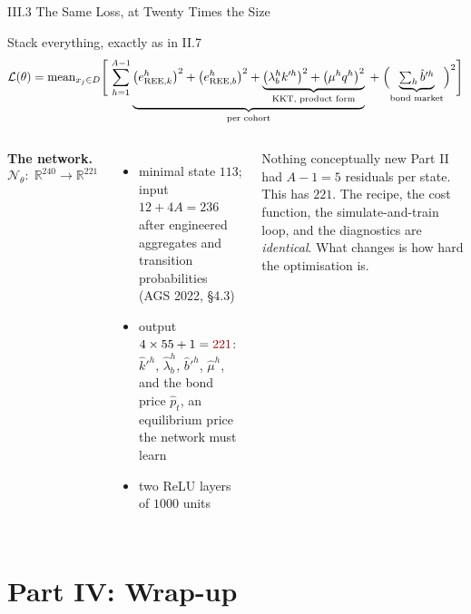 \documentclass[aspectratio=169,11pt]{beamer}
\newcommand{\emphc}[1]{\textcolor{harvardcrimson}{#1}}
\newcommand{\R}{\mathbb{R}}
\newcommand{\N}{\mathcal{N}}
\newcommand{\Loss}{\mathcal{L}}
\begin{document}
\begin{frame}{III.3 The Same Loss, at Twenty Times the Size}
\footnotesize
\begin{block}{Stack everything, exactly as in II.7}
\vspace{-6pt}
\[
\Loss(\theta) = \operatorname{mean}_{x_j \in D}\Biggl[\;\sum_{h=1}^{A-1}
\underbrace{\bigl(e_{\text{REE},k}^{h}\bigr)^2 + \bigl(e_{\text{REE},b}^{h}\bigr)^2
+ \underbrace{\bigl(\lambda_b^h k'^h\bigr)^2 + \bigl(\mu^h q^h\bigr)^2}_{\text{KKT, product form}}}_{\text{per cohort}}
\;+\; \Bigl(\underbrace{\textstyle\sum_h \hat b'^h}_{\text{bond market}}\Bigr)^2\Biggr]
\]
\vspace{-8pt}
\end{block}
\vspace{-4pt}
\begin{columns}[T]
\textbf{The network.}
\[
\N_\theta:\;\R^{240} \longrightarrow \R^{221}
\]
\vspace{-10pt}
\begin{itemize}\itemsep0pt
    \item minimal state $113$; input $12+4A = 236$ after engineered aggregates and transition probabilities (AGS 2022, \S 4.3)
    \item output $4\times 55 + 1 = \emphc{221}$: $\hat k'^h$, $\hat\lambda_b^h$, $\hat b'^h$, $\hat\mu^h$, and the
          \emphc{bond price $\hat p_t$}, an equilibrium price the network must learn
    \item two ReLU layers of $1000$ units
\end{itemize}
\begin{alertblock}{Nothing conceptually new}
\vspace{-2pt}
Part II had $A-1 = 5$ residuals per state.  This has $221$.  The recipe, the cost function, the
simulate-and-train loop, and the diagnostics are \emph{identical}.  What changes is how hard the
optimisation is.
\vspace{-2pt}
\end{alertblock}
\end{columns}
\end{frame}



\section{Part IV: Wrap-up}
\end{document}
